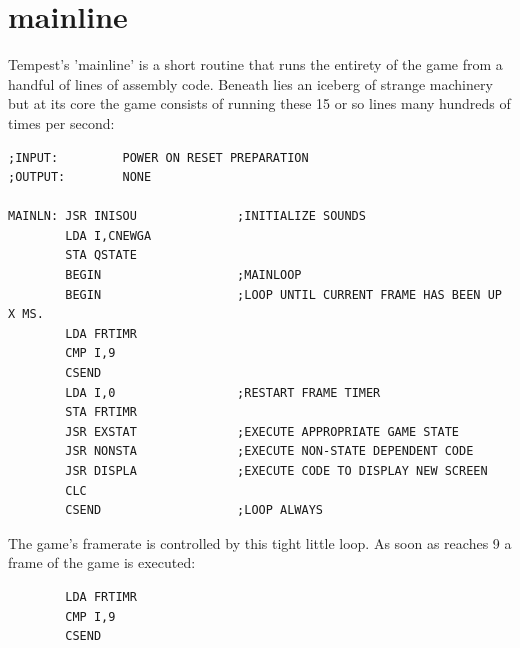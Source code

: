 \chapter{mainline}
\label{sec:listing}
\lstset{style=6502Style}
\lhead[tempest]{}

Tempest's 'mainline' is a short routine that runs the entirety of the game from a handful of lines
of assembly code. Beneath lies an iceberg of strange machinery but at its core the game consists of
running these 15 or so lines many hundreds of times per second:

\begin{lstlisting}
;INPUT:         POWER ON RESET PREPARATION
;OUTPUT:        NONE

MAINLN: JSR INISOU              ;INITIALIZE SOUNDS
        LDA I,CNEWGA
        STA QSTATE
        BEGIN                   ;MAINLOOP
        BEGIN                   ;LOOP UNTIL CURRENT FRAME HAS BEEN UP X MS.
        LDA FRTIMR
        CMP I,9
        CSEND
        LDA I,0                 ;RESTART FRAME TIMER
        STA FRTIMR
        JSR EXSTAT              ;EXECUTE APPROPRIATE GAME STATE
        JSR NONSTA              ;EXECUTE NON-STATE DEPENDENT CODE
        JSR DISPLA              ;EXECUTE CODE TO DISPLAY NEW SCREEN
        CLC
        CSEND                   ;LOOP ALWAYS
\end{lstlisting}

The game's framerate is controlled by this tight little loop. As soon as  reaches 9 a frame
of the game is executed:
\begin{lstlisting}
        LDA FRTIMR
        CMP I,9
        CSEND
\end{lstlisting}

